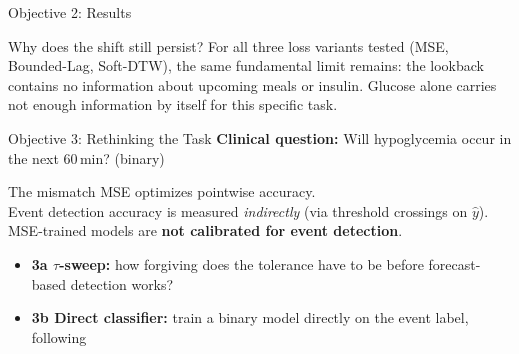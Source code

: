\begin{frame}[t,shrink=6]{Objective 2: Results}
  \begin{table}
    \centering
  \end{table}
  \begin{alertblock}{Why does the shift still persist?}
    For all three loss variants tested (MSE, Bounded-Lag, Soft-DTW), the same fundamental limit remains: the lookback contains no information about upcoming meals or insulin. Glucose alone carries not enough information by itself for this specific task.
  \end{alertblock}
\end{frame}

\begin{frame}[t]{Objective 3: Rethinking the Task}
  \textbf{Clinical question:} Will hypoglycemia occur in the next 60\,min? (binary)
  \vspace{8pt}
  \begin{block}{The mismatch}
    MSE optimizes pointwise accuracy.\\
    Event detection accuracy is measured \emph{indirectly} (via threshold crossings on $\hat{y}$).\\
    MSE-trained models are \textbf{not calibrated for event detection}.
  \end{block}
  \vspace{6pt}
  \begin{itemize}
    \item \textbf{3a $\tau$-sweep:} how forgiving does the tolerance have to be before forecast-based detection works?
    \item \textbf{3b Direct classifier:} train a binary model directly on the event label, following \cite{huni2023}
  \end{itemize}
\end{frame}

